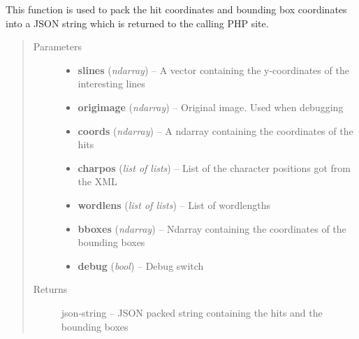 \documentclass[letterpaper,10pt,english]{sphinxmanual}
\begin{document}
\begin{fulllineitems}
\begin{fulllineitems}
\begin{quote}
\begin{description}
\end{description}\end{quote}

\end{fulllineitems}


\begin{fulllineitems}
\label{code:OratUtils.OratUtils.packCoordsToJson}
This function is used to pack the hit coordinates and bounding box coordinates 
into a JSON string which is returned to the calling PHP site.
\begin{quote}\begin{description}
\item[{Parameters}] \leavevmode\begin{itemize}
\item {} 
\textbf{slines} (\emph{ndarray}) -- A vector containing the y-coordinates of the interesting lines

\item {} 
\textbf{origimage} (\emph{ndarray}) -- Original image. Used when debugging

\item {} 
\textbf{coords} (\emph{ndarray}) -- A ndarray containing the coordinates of the hits

\item {} 
\textbf{charpos} (\emph{list of lists}) -- List of the character positions got from the XML

\item {} 
\textbf{wordlens} (\emph{list of lists}) -- List of wordlengths

\item {} 
\textbf{bboxes} (\emph{ndarray}) -- Ndarray containing the coordinates of the bounding boxes

\item {} 
\textbf{debug} (\emph{bool}) -- Debug switch

\end{itemize}

\item[{Returns}] \leavevmode
json-string -- JSON packed string containing the hits and the bounding boxes

\end{description}\end{quote}


\end{fulllineitems}
\end{fulllineitems}
\end{document}
